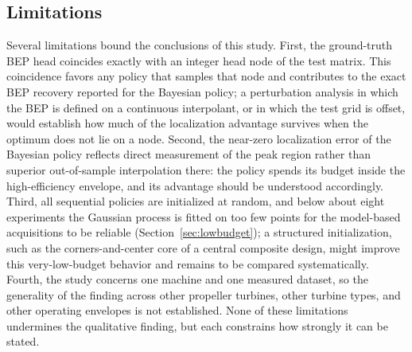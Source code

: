 \documentclass[preprint,12pt]{elsarticle}
\begin{document}
\subsection{Limitations}\label{sec:limits}
Several limitations bound the conclusions of this study. First, the ground-truth BEP
head coincides exactly with an integer head node of the test matrix. This coincidence
favors any policy that samples that node and contributes to the exact BEP recovery
reported for the Bayesian policy; a perturbation analysis in which the BEP is defined
on a continuous interpolant, or in which the test grid is offset, would establish how
much of the localization advantage survives when the optimum does not lie on a node.
Second, the near-zero localization error of the Bayesian policy reflects direct
measurement of the peak region rather than superior out-of-sample interpolation there:
the policy spends its budget inside the high-efficiency envelope, and its advantage
should be understood accordingly. Third, all sequential policies are initialized at
random, and below about eight experiments the Gaussian process is fitted on too few
points for the model-based acquisitions to be reliable (Section~\ref{sec:lowbudget});
a structured initialization, such as the corners-and-center core of a central
composite design, might improve this very-low-budget behavior and remains to be
compared systematically. Fourth, the study concerns one machine and one measured
dataset, so the generality of the finding across other propeller turbines, other
turbine types, and other operating envelopes is not established. None of these
limitations undermines the qualitative finding, but each constrains how strongly it can
be stated.
\end{document}
